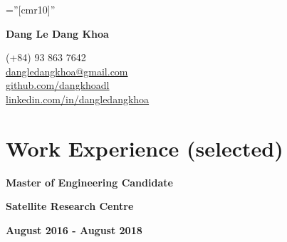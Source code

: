 \documentclass[10pt]{article}
\begin{document}
    \pagestyle{empty}       %
    \font\fb=''[cmr10]''    %

    \begin{multicols}{2}
        \begin{flushleft}
            \textbf{{\Huge Dang Le Dang Khoa }}
        \end{flushleft}

        \columnbreak

        \begin{flushright}
            \textsc (+84) 93 863 7642 \\
            \href{mailto:dangledangkhoa@gmail.com}{dangledangkhoa@gmail.com} \\
            \href{https://github.com/dangkhoadl}{github.com/dangkhoadl} \\
            \href{https://sg.linkedin.com/in/dangledangkhoa}{linkedin.com/in/dangledangkhoa}
        \end{flushright}
    \end{multicols}

    \vspace{-5mm}

    \section{Work Experience (selected)}
        \vspace{-5mm}

        \begin{multicols}{3}
            \begin{flushleft}
                \textbf{Master of Engineering Candidate}
            \end{flushleft}

            \columnbreak

            \begin{center}
                \textbf{Satellite Research Centre}
            \end{center}

            \columnbreak

            \begin{flushright}
                \textbf{August 2016 - August 2018}
            \end{flushright}
        \end{multicols}
\end{document}
